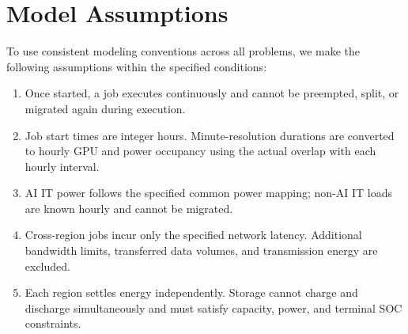 \section{Model Assumptions}

To use consistent modeling conventions across all problems, we make the following assumptions within the specified conditions:
\begin{enumerate}
    \item Once started, a job executes continuously and cannot be preempted, split, or migrated again during execution.
    \item Job start times are integer hours. Minute-resolution durations are converted to hourly GPU and power occupancy using the actual overlap with each hourly interval.
    \item AI IT power follows the specified common power mapping; non-AI IT loads are known hourly and cannot be migrated.
    \item Cross-region jobs incur only the specified network latency. Additional bandwidth limits, transferred data volumes, and transmission energy are excluded.
    \item Each region settles energy independently. Storage cannot charge and discharge simultaneously and must satisfy capacity, power, and terminal SOC constraints.
\end{enumerate}
